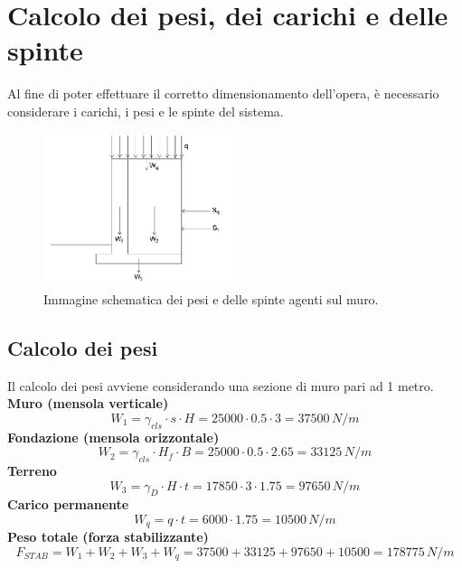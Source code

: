 \section{Calcolo dei pesi, dei carichi e delle spinte}
Al fine di poter effettuare il corretto dimensionamento dell'opera, è necessario considerare i carichi, i pesi e le spinte del sistema.
\begin{figure}[H]
    \centering
    \includegraphics[width=0.5\textwidth]{immagini/pesi_muro.png} \hfill
        \caption{Immagine schematica dei pesi e delle spinte agenti sul muro.}
    \label{figure:pesi_muro}
\end{figure}
\subsection{Calcolo dei pesi}
Il calcolo dei pesi avviene considerando una sezione di muro pari ad 1 metro.\\
\textbf{Muro (mensola verticale)}
\begin{equation*}
    W_1 = \gamma_{cls} \cdot s \cdot H = 25000 \cdot 0.5 \cdot 3 = 37500 \,N/m
\end{equation*}
\textbf{Fondazione (mensola orizzontale)}
\begin{equation*}
    W_2 = \gamma_{cls} \cdot H_f \cdot B = 25000 \cdot 0.5 \cdot 2.65 = 33125 \,N/m
\end{equation*}
\textbf{Terreno }
\begin{equation*}
    W_3 = \gamma_{D} \cdot H \cdot t = 17850 \cdot 3 \cdot 1.75 = 97650 \,N/m
\end{equation*}
\textbf{Carico permanente}
\begin{equation*}
    W_q = q \cdot t = 6000 \cdot 1.75 = 10500 \,N/m
\end{equation*}
\textbf{Peso totale (forza stabilizzante)}
\begin{equation*}
    F_{STAB} = W_1 + W_2 + W_3 + W_q = 37500 + 33125 + 97650 + 10500 = 178775 \,N/m 
\end{equation*}

